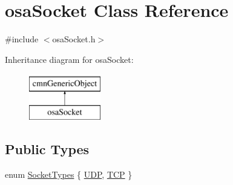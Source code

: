 \hypertarget{classosa_socket}{\section{osa\-Socket Class Reference}
\label{classosa_socket}
}


{\ttfamily \#include $<$osa\-Socket.\-h$>$}

Inheritance diagram for osa\-Socket\-:\begin{figure}[H]
\begin{center}
\leavevmode
\includegraphics[height=2.000000cm]{d9/d26/classosa_socket}
\end{center}
\end{figure}
\subsection*{Public Types}
\begin{DoxyCompactItemize}
\item 
enum \hyperlink{classosa_socket_adeb99e6a5b2d4e503e0308ccb9677a00}{Socket\-Types} \{ \hyperlink{classosa_socket_adeb99e6a5b2d4e503e0308ccb9677a00a30ff2c2d5d46158f56ac6d521629612a}{U\-D\-P}, 
\hyperlink{classosa_socket_adeb99e6a5b2d4e503e0308ccb9677a00a285ce3d0ac4094f708fa3f7b2f222430}{T\-C\-P}
 \}
\end{DoxyCompactItemize}
